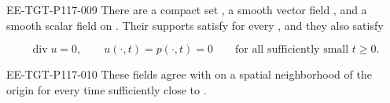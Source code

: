 \begin{proposition}\label{prop:10.1}
\begin{EESegment}{EE-TGT-P117-009}
There are a compact set , a smooth vector field
, and a smooth scalar field  on
\NSi{NS-F-P117-033}{\mathbb R^3\times[0,1)}. Their supports satisfy
for every ,
and they also satisfy
\end{EESegment}
\begin{equation}
\operatorname{div}u=0,
\qquad u(\mathord\cdot,t)=p(\mathord\cdot,t)=0
\qquad\text{for all sufficiently small }t\geq0.
\tag{10.2}\label{eq:10.2}
\end{equation}
\begin{EESegment}{EE-TGT-P117-010}
These fields agree with  on a spatial
neighborhood of the origin for every time sufficiently close to .
\end{EESegment}
\end{proposition}
%
